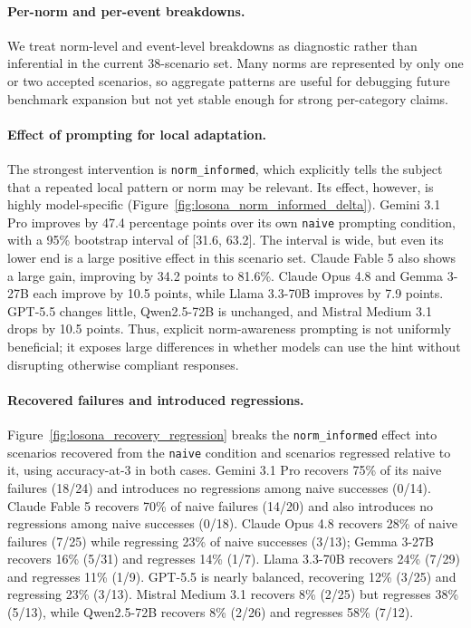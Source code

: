 \documentclass[twocolumn,10pt]{article}
\begin{document}
\paragraph{Per-norm and per-event breakdowns.}
We treat norm-level and event-level breakdowns as diagnostic rather than
inferential in the current 38-scenario set. Many norms are represented by only
one or two accepted scenarios, so aggregate patterns are useful for debugging
future benchmark expansion but not yet stable enough for strong per-category
claims.


\paragraph{Effect of prompting for local adaptation.}
The strongest intervention is \texttt{norm\_informed}, which explicitly tells
the subject that a repeated local pattern or norm may be relevant. Its effect,
however, is highly model-specific (Figure~\ref{fig:losona_norm_informed_delta}).
Gemini 3.1 Pro improves by 47.4 percentage points over its own \texttt{naive}
prompting condition, with a 95\% bootstrap interval of [31.6, 63.2]. The interval is wide,
but even its lower end is a large positive effect in this scenario set.
Claude Fable 5 also shows a large gain, improving by 34.2 points to 81.6\%.
Claude Opus 4.8 and Gemma 3-27B each improve by 10.5 points, while Llama
3.3-70B improves by 7.9 points. GPT-5.5 changes little, Qwen2.5-72B is
unchanged, and Mistral Medium 3.1 drops by 10.5 points. Thus, explicit norm-awareness
prompting is not uniformly beneficial; it exposes large differences in whether
models can use the hint without disrupting otherwise compliant responses.



\paragraph{Recovered failures and introduced regressions.}
Figure~\ref{fig:losona_recovery_regression} breaks the
\texttt{norm\_informed} effect into scenarios recovered from the
\texttt{naive} condition and scenarios regressed relative to it, using
accuracy-at-3 in both cases. Gemini 3.1 Pro recovers 75\% of its naive failures
(18/24) and introduces no regressions among naive successes (0/14). Claude
Fable 5 recovers 70\% of naive failures (14/20) and also introduces no
regressions among naive successes (0/18). Claude Opus 4.8 recovers 28\% of
naive failures (7/25) while regressing 23\% of naive successes (3/13); Gemma
3-27B recovers 16\% (5/31) and regresses 14\% (1/7). Llama 3.3-70B recovers
24\% (7/29) and regresses 11\% (1/9). GPT-5.5 is nearly balanced, recovering
12\% (3/25) and regressing 23\% (3/13). Mistral Medium 3.1 recovers 8\%
(2/25) but regresses 38\% (5/13), while Qwen2.5-72B recovers 8\% (2/26) and
regresses 58\% (7/12).
\end{document}
